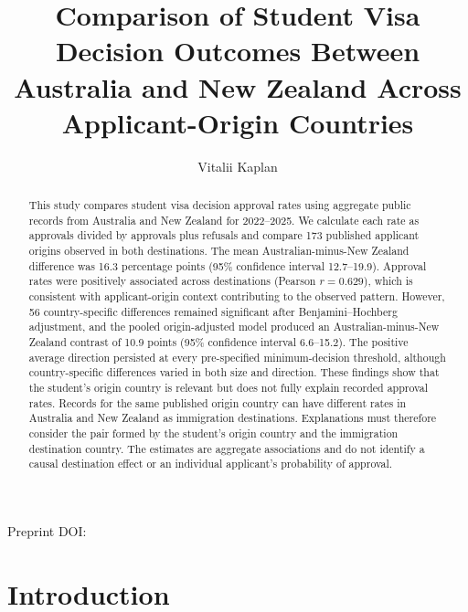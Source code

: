 \documentclass[runningheads]{llncs}
\begin{document}
\title{Comparison of Student Visa Decision Outcomes Between Australia and New Zealand Across Applicant-Origin Countries}

\author{Vitalii Kaplan}

\maketitle

\begin{center}
\small Preprint DOI: 
\end{center}

\begin{abstract}
This study compares student visa decision approval rates using aggregate public records from Australia and New Zealand for 2022--2025. We calculate each rate as approvals divided by approvals plus refusals and compare 173 published applicant origins observed in both destinations.
The mean Australian-minus-New Zealand difference was 16.3 percentage points (95\% confidence interval 12.7--19.9). Approval rates were positively associated across destinations (Pearson $r=0.629$), which is consistent with applicant-origin context contributing to the observed pattern. However, 56 country-specific differences remained significant after Benjamini--Hochberg adjustment, and the pooled origin-adjusted model produced an Australian-minus-New Zealand contrast of 10.9 points (95\% confidence interval 6.6--15.2). The positive average direction persisted at every pre-specified minimum-decision threshold, although country-specific differences varied in both size and direction.
These findings show that the student's origin country is relevant but does not fully explain recorded approval rates. Records for the same published origin country can have different rates in Australia and New Zealand as immigration destinations. Explanations must therefore consider the pair formed by the student's origin country and the immigration destination country. The estimates are aggregate associations and do not identify a causal destination effect or an individual applicant's probability of approval.
\end{abstract}

\section{Introduction}
\end{document}
